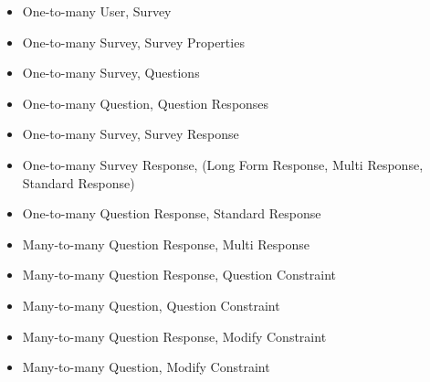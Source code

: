 \documentclass{article}
\begin{document}
\begin{itemize}
\item One-to-many User, Survey
\item One-to-many Survey, Survey Properties
\item One-to-many Survey, Questions
\item One-to-many Question, Question Responses
\item One-to-many Survey, Survey Response
\item One-to-many Survey Response, (Long Form Response, Multi
  Response, Standard Response)
\item One-to-many Question Response, Standard Response
\item Many-to-many Question Response, Multi Response
\item Many-to-many Question Response, Question Constraint
\item Many-to-many Question, Question Constraint
\item Many-to-many Question Response, Modify Constraint
\item Many-to-many Question, Modify Constraint
\end{itemize}
\end{document}

